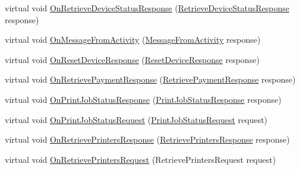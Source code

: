 \begin{DoxyCompactItemize}
virtual void \hyperlink{classcom_1_1clover_1_1remotepay_1_1sdk_1_1_default_clover_connector_listener_a493d5c1fde5a535262b497450c4d2a8f}{On\+Retrieve\+Device\+Status\+Response} (\hyperlink{classcom_1_1clover_1_1remotepay_1_1sdk_1_1_retrieve_device_status_response}{Retrieve\+Device\+Status\+Response} response)
\item 
virtual void \hyperlink{classcom_1_1clover_1_1remotepay_1_1sdk_1_1_default_clover_connector_listener_a1ae1e3ea093662ba2a137afb50453aa9}{On\+Message\+From\+Activity} (\hyperlink{classcom_1_1clover_1_1remotepay_1_1sdk_1_1_message_from_activity}{Message\+From\+Activity} response)
\item 
virtual void \hyperlink{classcom_1_1clover_1_1remotepay_1_1sdk_1_1_default_clover_connector_listener_aac55ac00dcd9150f9b05f2b74597c868}{On\+Reset\+Device\+Response} (\hyperlink{classcom_1_1clover_1_1remotepay_1_1sdk_1_1_reset_device_response}{Reset\+Device\+Response} response)
\item 
virtual void \hyperlink{classcom_1_1clover_1_1remotepay_1_1sdk_1_1_default_clover_connector_listener_a275810025eccbd5cc81fe48752fa8872}{On\+Retrieve\+Payment\+Response} (\hyperlink{classcom_1_1clover_1_1remotepay_1_1sdk_1_1_retrieve_payment_response}{Retrieve\+Payment\+Response} response)
\item 
virtual void \hyperlink{classcom_1_1clover_1_1remotepay_1_1sdk_1_1_default_clover_connector_listener_a8460fc8d168973b35b9306178b521ac0}{On\+Print\+Job\+Status\+Response} (\hyperlink{classcom_1_1clover_1_1remotepay_1_1sdk_1_1_print_job_status_response}{Print\+Job\+Status\+Response} response)
\item 
virtual void \hyperlink{classcom_1_1clover_1_1remotepay_1_1sdk_1_1_default_clover_connector_listener_a739a8523907057a33f0babacef2b1336}{On\+Print\+Job\+Status\+Request} (\hyperlink{classcom_1_1clover_1_1remotepay_1_1sdk_1_1_print_job_status_request}{Print\+Job\+Status\+Request} request)
\item 
virtual void \hyperlink{classcom_1_1clover_1_1remotepay_1_1sdk_1_1_default_clover_connector_listener_ae762b510b0e85527d434ee9dcf783684}{On\+Retrieve\+Printers\+Response} (\hyperlink{classcom_1_1clover_1_1remotepay_1_1sdk_1_1_retrieve_printers_response}{Retrieve\+Printers\+Response} response)
\item 
virtual void \hyperlink{classcom_1_1clover_1_1remotepay_1_1sdk_1_1_default_clover_connector_listener_a4a3e49c96e516bf5da1c0c1b3f701740}{On\+Retrieve\+Printers\+Request} (Retrieve\+Printers\+Request request)
\end{DoxyCompactItemize}


